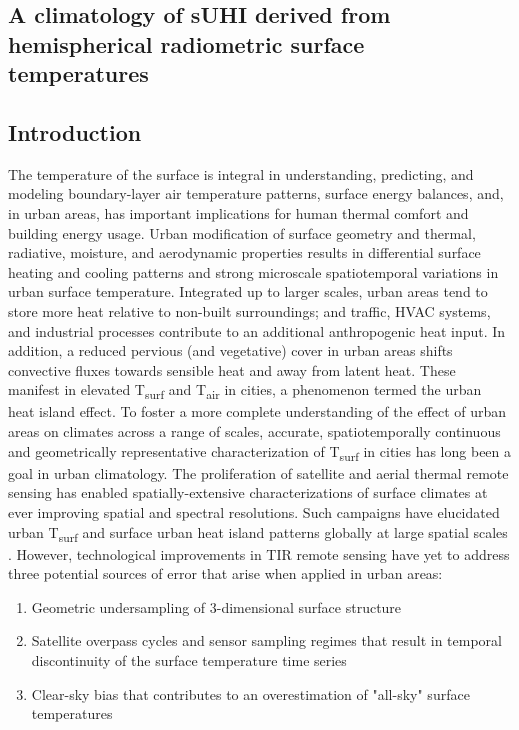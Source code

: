 \begin{bibunit}

\rhead{\thepage}

\chapter{A climatology of sUHI derived from hemispherical radiometric surface temperatures}
\label{paper2}

\section{Introduction}

The temperature of the surface is integral in understanding, predicting, and modeling boundary-layer air temperature patterns, surface energy balances, and, in urban areas, has important implications for human thermal comfort and building energy usage. Urban modification of surface geometry and thermal, radiative, moisture, and aerodynamic properties results in differential surface heating and cooling patterns and strong microscale spatiotemporal variations in urban surface temperature. Integrated up to larger scales, urban areas tend to store more heat relative to non-built surroundings; and traffic, HVAC systems, and industrial processes contribute to an additional anthropogenic heat input. In addition, a reduced pervious (and vegetative) cover in urban areas shifts convective fluxes towards sensible heat and away from latent heat. These manifest in elevated T\textsubscript{surf} and T\textsubscript{air} in cities, a phenomenon termed the urban heat island effect. To foster a more complete understanding of the effect of urban areas on climates across a range of scales, accurate, spatiotemporally continuous and geometrically representative characterization of T\textsubscript{surf} in cities has long been a goal in urban climatology. The proliferation of satellite and aerial thermal remote sensing has enabled spatially-extensive characterizations of surface climates at ever improving spatial and spectral resolutions. Such campaigns have elucidated urban T\textsubscript{surf} and surface urban heat island patterns globally at large spatial scales \citep{Peng2012,Zhao2014}. However, technological improvements in TIR remote sensing have yet to address three potential sources of error that arise when applied in urban areas: 

\begin{enumerate}
	\item Geometric undersampling of 3-dimensional surface structure
	\item Satellite overpass cycles and sensor sampling regimes that result in temporal discontinuity of the surface temperature time series
	\item Clear-sky bias that contributes to an overestimation of "all-sky" surface temperatures
\end{enumerate}


\end{bibunit}
